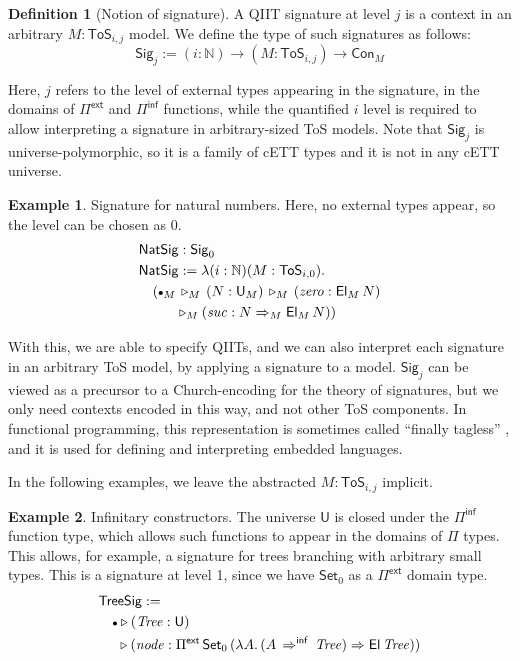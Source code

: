 \documentclass{article}
\theoremstyle{definition}
\newtheorem{definition}{Definition}
\newtheorem{example}{Example}
\theoremstyle{theorem}
\newcommand{\Con}{\mathsf{Con}}
\newcommand{\U}{\mathsf{U}}
\newcommand{\El}{\mathsf{El}}
\newcommand{\ra}{\rightarrow}
\newcommand{\Set}{\mathsf{Set}}
\newcommand{\ToS}{\mathsf{ToS}}
\newcommand{\ext}{\triangleright}
\newcommand{\emptycon}{\scaleobj{.75}\bullet}
\newcommand{\Pii}{\Pi}
\newcommand{\Pie}{\Pi^{\mathsf{ext}}}
\newcommand{\Piinf}{\Pi^{\mathsf{inf}}}
\newcommand{\Sig}{\mathsf{Sig}}
\newcommand{\NatSig}{\mathsf{NatSig}}
\newcommand{\mi}[1]{\mathit{#1}}
\newcommand{\arri}{\Rightarrow}
\newcommand{\arrinf}{\Rightarrow^{\mathsf{inf}}}
\begin{document}
\begin{definition}[Notion of signature]\label{def:signature}
A QIIT signature at level $j$ is a context in an arbitrary $M : \ToS_{i,j}$
model. We define the type of such signatures as follows:
\[
  \Sig_j := (i : \mathbb{N})\ra(M : \ToS_{i,j})\ra \Con_M
\]

Here, $j$ refers to the level of external types appearing in the signature, in
the domains of $\Pie$ and $\Piinf$ functions, while the quantified $i$ level is
required to allow interpreting a signature in arbitrary-sized ToS models. Note
that $\Sig_j$ is universe-polymorphic, so it is a family of cETT types and it is
not in any cETT universe.

\begin{example}{
    Signature for natural numbers. Here, no external types appear, so the level
    can be chosen as $0$.}
\begin{alignat*}{3}
  & \NatSig : \Sig_0 \\
  & \NatSig := \lambda (i :\mathbb{N})(M : \ToS_{i,0}).\\
  & \hspace{1em}(\emptycon_M\,\ext_M\, (N : \U_M) \,\ext_M\,(\mi{zero} : \El_M\,N)\\
  & \hspace{2.67em}\ext_M (\mi{suc} : N\arri_M\El_M\,N))
\end{alignat*}
\end{example}

With this, we are able to specify QIITs, and we can also interpret each
signature in an arbitrary ToS model, by applying a signature to a model.
$\Sig_j$ can be viewed as a precursor to a Church-encoding for the theory of
signatures, but we only need contexts encoded in this way, and not other ToS
components. In functional programming, this representation is sometimes called
``finally tagless'' \cite{carette2007finally}, and it is used for defining and
interpreting embedded languages.
\end{definition}

In the following examples, we leave the abstracted $M : \ToS_{i,j}$ implicit.

\begin{example}{Infinitary constructors}. The universe $\U$ is closed under
the $\Piinf$ function type, which allows such functions to appear in the domains
of $\Pii$ types. This allows, for example, a signature for trees branching with
arbitrary small types. This is a signature at level 1, since we have $\Set_0$ as
a $\Pie$ domain type.
\begin{alignat*}{3}
& \mathsf{TreeSig} := \\
& \hspace{1em}\emptycon \ext (\mi{Tree} : \U)\\
& \hspace{1.35em}\ext (\mi{node} : \Pie\,\Set_0\,(\lambda A.\,(A\,\arrinf\,\mi{Tree})\arri\El\,\mi{Tree}))
\end{alignat*}
\end{example}
\end{document}
